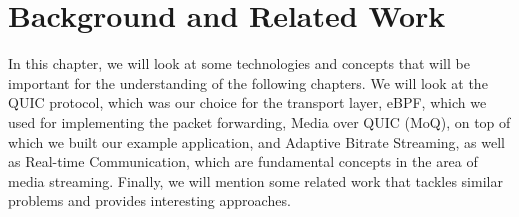 
\chapter{Background and Related Work}\label{chap:background}

In this chapter, we will look at some technologies and concepts 
that will be important for the understanding of the following chapters.
We will look at the QUIC protocol, which was our choice for the transport layer, eBPF, which we used for implementing the packet 
forwarding, Media over QUIC (MoQ), on top of which we built 
our example application, and Adaptive Bitrate Streaming, as well as Real-time Communication, which are fundamental concepts in the area 
of media streaming.
Finally, we will mention some related work that tackles similar 
problems and provides interesting approaches.  






